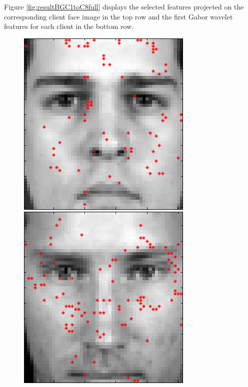 \mbox{Figure} \ref{fig:resultBGC1toC8full} displays the selected features projected on the corresponding client face image in the top row and the first Gabor wavelet features for each client in the bottom row. 
\begin{figure}[ht]
 \includegraphics[width=\textwidth*11/100]{ch5/figures/XM2VTS_Full_1.png}
 \includegraphics[width=\textwidth*11/100]{ch5/figures/XM2VTS_Full_2.png}

\end{figure}
